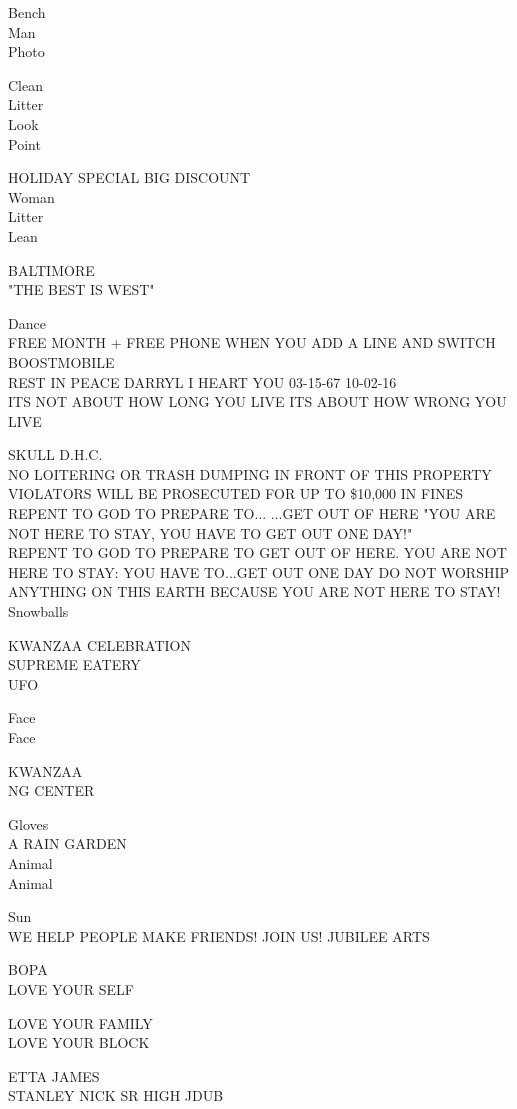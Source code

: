 \documentclass[10pt,letterpaper]{article}
\begin{document}
Bench\\
Man\\
Photo

Clean\\
Litter\\
Look\\
Point

HOLIDAY SPECIAL BIG DISCOUNT\\
Woman\\
Litter\\
Lean

BALTIMORE\\
"THE BEST IS WEST"

Dance\\
FREE MONTH + FREE PHONE WHEN YOU ADD A LINE AND SWITCH BOOSTMOBILE\\
REST IN PEACE DARRYL I HEART YOU 03{-}15{-}67 10{-}02{-}16\\
ITS NOT ABOUT HOW LONG YOU LIVE ITS ABOUT HOW WRONG YOU LIVE

SKULL D.H.C.\\
NO LOITERING OR TRASH DUMPING IN FRONT OF THIS PROPERTY VIOLATORS WILL BE PROSECUTED FOR UP TO \$10,000 IN FINES REPENT TO GOD TO PREPARE TO... ...GET OUT OF HERE "YOU ARE NOT HERE TO STAY, YOU HAVE TO GET OUT ONE DAY!"\\
REPENT TO GOD TO PREPARE TO GET OUT OF HERE.  YOU ARE NOT HERE TO STAY: YOU HAVE TO...GET OUT ONE DAY DO NOT WORSHIP ANYTHING ON THIS EARTH BECAUSE YOU ARE NOT HERE TO STAY!\\
Snowballs

KWANZAA CELEBRATION\\
SUPREME EATERY\\
UFO

Face\\
Face

KWANZAA\\
NG CENTER

Gloves\\
A RAIN GARDEN\\
Animal\\
Animal

Sun\\
WE HELP PEOPLE MAKE FRIENDS!  JOIN US!  JUBILEE ARTS

BOPA\\
LOVE YOUR SELF

LOVE YOUR FAMILY\\
LOVE YOUR BLOCK

ETTA JAMES\\
STANLEY NICK SR HIGH JDUB
\end{document}
